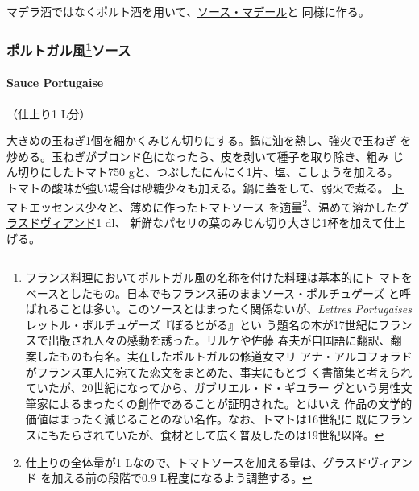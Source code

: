 \begin{recette}
マデラ酒ではなくポルト酒を用いて、\protect\hyperlink{sauce-madere}{ソース・マデール}と
同様に作る。

\maeaki

\hypertarget{ux30ddux30ebux30c8ux30acux30ebux98a873ux30bdux30fcux30b9}{%
\subsubsection[ポルトガル風ソース]{\texorpdfstring{ポルトガル風\footnote{フランス料理においてポルトガル風の名称を付けた料理は基本的にト
  マトをベースとしたもの。日本でもフランス語のままソース・ポルチュゲーズ
  と呼ばれることは多い。このソースとはまったく関係ないが、\emph{Lettres
  Portugaises} レットル・ポルチュゲーズ『ぽるとがる』とい
  う題名の本が17世紀にフランスで出版され人々の感動を誘った。リルケや佐藤
  春夫が自国語に翻訳、翻案したものも有名。実在したポルトガルの修道女マリ
  アナ・アルコフォラドがフランス軍人に宛てた恋文をまとめた、事実にもとづ
  く書簡集と考えられていたが、20世紀になってから、ガブリエル・ド・ギユラー
  グという男性文筆家によるまったくの創作であることが証明された。とはいえ
  作品の文学的価値はまったく減じることのない名作。なお、トマトは16世紀に
  既にフランスにもたらされていたが、食材として広く普及したのは19世紀以降。}ソース}{ポルトガル風ソース}}\label{ux30ddux30ebux30c8ux30acux30ebux98a873ux30bdux30fcux30b9}}

\hypertarget{sauce-portugaise}{%
\paragraph{Sauce Portugaise}\label{sauce-portugaise}}

   

（仕上り1 L分）

大きめの玉ねぎ1個を細かくみじん切りにする。鍋に油を熱し、強火で玉ねぎ
を炒める。玉ねぎがブロンド色になったら、皮を剥いて種子を取り除き、粗み
じん切りにしたトマト750 gと、つぶしたにんにく1片、塩、こしょうを加える。
トマトの酸味が強い場合は砂糖少々も加える。鍋に蓋をして、弱火で煮る。
\protect\hyperlink{essences-diverses}{トマトエッセンス}少々と、薄めに作ったトマトソース
を適量\footnote{仕上りの全体量が1
  Lなので、トマトソースを加える量は、グラスドヴィアンド
  を加える前の段階で0.9 L程度になるよう調整する。}、温めて溶かした\protect\hyperlink{glace-de-viande}{グラスドヴィアンド}1
dl、 新鮮なパセリの葉のみじん切り大さじ1杯を加えて仕上げる。


\end{recette}
